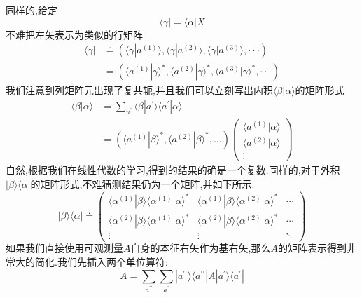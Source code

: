 \documentclass[lang=cn,newtx,10pt,scheme=chinese,thmcnt=section]{elegantbook}
\begin{document}
同样的,给定
\begin{equation}
	\langle\gamma|=\langle\alpha|X
\end{equation}
不难把左矢表示为类似的行矩阵
\begin{equation}
	\begin{aligned}\langle\gamma|&\doteq(\langle\gamma|a^{(1)}\rangle,\langle\gamma|a^{(2)}\rangle,\langle\gamma|a^{(3)}\rangle,\cdotp\cdotp\cdotp)\\&=(\langle a^{(1)}|\gamma\rangle^*,\langle a^{(2)}|\gamma\rangle^*,\langle a^{(3)}|\gamma\rangle^*,\cdotp\cdotp\cdotp)\end{aligned}
\end{equation}
我们注意到列矩阵元出现了复共轭,并且我们可以立刻写出内积$\langle\beta|\alpha\rangle$的矩阵形式
\begin{equation}
	\begin{aligned}
		\langle\beta|\alpha\rangle
		&=\sum_{{u^{\prime}}}\langle\beta|a^{\prime}\rangle\langle a^{\prime}|\alpha\rangle\\
		&=(\langle a^{(1)}|\beta\rangle^{*},\langle a^{(2)}|\beta\rangle^{*},\ldots)
		\begin{pmatrix}
			\langle a^{(1)}|\alpha\rangle\\
			\langle a^{(2)}|\alpha\rangle\\
			\vdots
		\end{pmatrix}
	\end{aligned}
\end{equation}
自然,根据我们在线性代数的学习,得到的结果的确是一个复数.同样的,对于外积$|\beta\rangle\langle\alpha|$的矩阵形式,不难猜测结果仍为一个矩阵,并如下所示:
\begin{equation}
	|\beta\rangle\langle\alpha|\doteq
	\begin{pmatrix}
		\langle\alpha^{(1)}|\beta\rangle\langle\alpha^{(1)}|\alpha\rangle^*&\langle\alpha^{(1)}|\beta\rangle\langle\alpha^{(2)}|\alpha\rangle^*&\cdots\\\langle\alpha^{(2)}|\beta\rangle\langle\alpha^{(1)}|\alpha\rangle^*&\langle\alpha^{(2)}|\beta\rangle\langle\alpha^{(2)}|\alpha\rangle^*&\cdots\\\vdots&\vdots&\ddots
	\end{pmatrix}
\end{equation}
如果我们直接使用可观测量$A$自身的本征右矢作为基右矢,那么$A$的矩阵表示得到非常大的简化.我们先插入两个单位算符:
\begin{equation}
	A=\sum_{a^{\prime\prime}}\sum_{a^{\prime}}|a^{\prime\prime}\rangle\langle a^{\prime\prime}|A|a^{\prime}\rangle\langle a^{\prime}|
\end{equation}
\end{document}
